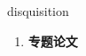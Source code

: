 
\begin{frame}
{\huge disquisition}
\begin{center}
\begin{enumerate}\Large
  \item \textbf{专题论文}
\end{enumerate}
\end{center}
\end{frame}
